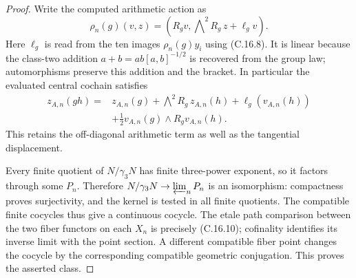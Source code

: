 \begin{proof}
Write the computed arithmetic action as
\[
 \rho_n(g)(v,z)=
       (R_gv,\bigwedge\nolimits^2R_g\,z+\ell_gv).
                                                               \tag{C.16.12}
\]
Here $\ell_g$ is read from the ten images
$\rho_n(g)y_i$ using (C.16.8).
It is linear because the class-two addition
$a+b=ab[a,b]^{-1/2}$ is recovered from the
group law; automorphisms preserve this
addition and the bracket.  In particular
the evaluated central cochain satisfies
\[
 \begin{split}
 z_{A,n}(gh)={}&z_{A,n}(g)
   +\bigwedge\nolimits^2R_g\,z_{A,n}(h)
   +\ell_g(v_{A,n}(h))\\
 &+\tfrac12v_{A,n}(g)\wedge R_gv_{A,n}(h).
 \end{split}                                              \tag{C.16.13}
\]
This retains the off-diagonal arithmetic term
as well as the tangential displacement.

Every finite quotient of $N/\gamma_3N$ has
finite three-power exponent, so it factors
through some $P_n$.  Therefore
$N/\gamma_3N\to\varprojlim_nP_n$ is an
isomorphism: compactness proves surjectivity,
and the kernel is tested in all finite
quotients.  The compatible finite cocycles
thus give a continuous cocycle.
The etale path comparison between the two
fiber functors on each $X_n$ is precisely
(C.16.10); cofinality identifies its inverse
limit with the point section.  A different
compatible fiber point changes the cocycle
by the corresponding compatible geometric
conjugation.  This proves the asserted class.
\end{proof}

